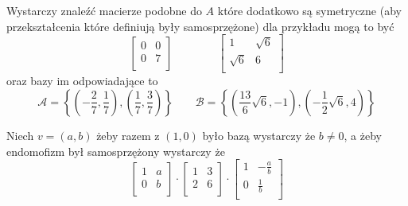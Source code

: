\documentclass[11pt]{scrartcl}
\begin{document}
            \begin{walk}
                \item Wystarczy znaleźć macierze podobne do $A$ które dodatkowo są symetryczne (aby przekształcenia które definiują były samosprzężone) dla przykładu mogą to być
                  \[
                     \begin{bmatrix}
                         0 & 0 \\
                         0 & 7 \\
                     \end{bmatrix}
                     \qquad \qquad 
                     \begin{bmatrix}
                         1 & \sqrt{6}  \\
                         \sqrt{6}  & 6 \\
                     \end{bmatrix}
                  \]
                  oraz bazy im odpowiadające to 
                  \[
                      \mathcal{A} = \left \{ \left ( - \frac{2}{7} , \frac{1}{7} \right ) , \left ( \frac{1}{7} , \frac{3}{7} \right ) \right \}
                      \qquad 
                      \mathcal{B} = \left \{ \left ( \frac{13}{6} \sqrt{6}, -1  \right ) , \left ( - \frac{1}{2} \sqrt{6} , 4  \right ) \right \} 
                  \]
                \item Niech $v = (a,b)$ żeby razem z $\left ( 1 , 0 \right )$ było bazą wystarczy że $b \not = 0$, a żeby endomofizm był samosprzężony wystarczy że 
                  \[
                      \begin{bmatrix}
                         1  & a \\
                         0  & b \\
                      \end{bmatrix}
                      \cdot 
                      \begin{bmatrix}
                          1 & 3 \\
                          2 & 6 \\
                      \end{bmatrix}
                      \cdot 
                      \begin{bmatrix}
                          1 & -\frac{a}{b} \\
                          0 & \frac{1}{b} \\
                      \end{bmatrix}
\]
\end{walk}
\end{document}
